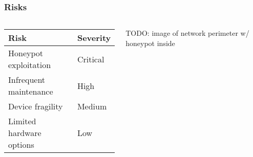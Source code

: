 \begin{frame}
\frametitle{Risks}

\begin{columns}[c]

\begin{table}
\begin{center}
\begin{tabular}{l l}
\textbf{Risk} & \textbf{Severity} \\
\midrule
Honeypot exploitation & Critical \\
Infrequent maintenance & High \\
Device fragility & Medium \\
Limited hardware options & Low \\
\bottomrule
\end{tabular}
\end{center}
\end{table}


TODO: image of network perimeter w/ honeypot inside

\end{columns}

\end{frame}
